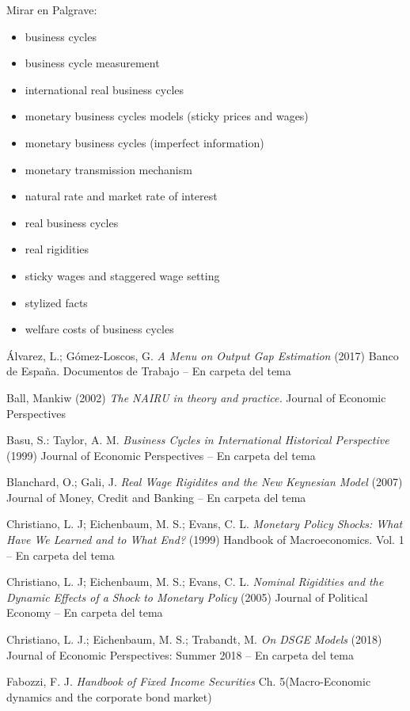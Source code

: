 \documentclass{nuevotema}
\begin{document}
Mirar en Palgrave:
\begin{itemize}
	\item business cycles
	\item business cycle measurement
	\item international real business cycles
	\item monetary business cycles models (sticky prices and wages)
	\item monetary business cycles (imperfect information)
	\item monetary transmission mechanism
    \item natural rate and market rate of interest
    \item real business cycles
    \item real rigidities
    \item sticky wages and staggered wage setting
    \item stylized facts
    \item welfare costs of business cycles
\end{itemize}

Álvarez, L.; Gómez-Loscos, G. \textit{A Menu on Output Gap Estimation} (2017) Banco de España. Documentos de Trabajo -- En carpeta del tema

Ball, Mankiw (2002) \textit{The NAIRU in theory and practice.} Journal of Economic Perspectives

Basu, S.: Taylor, A. M. \textit{Business Cycles in International Historical Perspective} (1999) Journal of Economic Perspectives -- En carpeta del tema

Blanchard, O.; Gali, J. \textit{Real Wage Rigidites and the New Keynesian Model} (2007) Journal of Money, Credit and Banking -- En carpeta del tema

Christiano, L. J; Eichenbaum, M. S.; Evans, C. L. \textit{Monetary Policy Shocks: What Have We Learned and to What End?} (1999) Handbook of Macroeconomics. Vol. 1 -- En carpeta del tema

Christiano, L. J; Eichenbaum, M. S.; Evans, C. L. \textit{Nominal Rigidities and the Dynamic Effects of a Shock to Monetary Policy} (2005) Journal of Political Economy -- En carpeta del tema 

Christiano, L. J.; Eichenbaum, M. S.; Trabandt, M. \textit{On DSGE Models} (2018) Journal of Economic Perspectives: Summer 2018 -- En carpeta del tema

Fabozzi, F. J. \textit{Handbook of Fixed Income Securities} Ch. 5(Macro-Economic dynamics and the corporate bond market)
\end{document}
